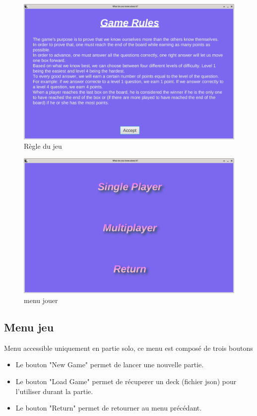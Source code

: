 \begin{figure}[h]
	\centering
	\includegraphics[width=\textwidth]{rule.png}
	\caption{Règle du jeu}
	\label{fig:regle_du_jeu}
\end{figure}

\newpage
\begin{figure}[h]
	\centering
	\includegraphics[width=\textwidth]{menujouer.png}
	\caption{menu jouer}
	\label{fig:menu_jouer}
\end{figure}

\newpage
\subsection{Menu jeu}
Menu accessible uniquement en partie solo, ce menu est composé de trois boutons 
\begin{itemize}
	\item Le bouton "New Game" permet de lancer une nouvelle partie.
	\item Le bouton "Load Game" permet de récuperer un deck (fichier json) pour l'utiliser durant la partie.
	\item Le bouton "Return" permet de retourner au menu précédant.
\end{itemize}

